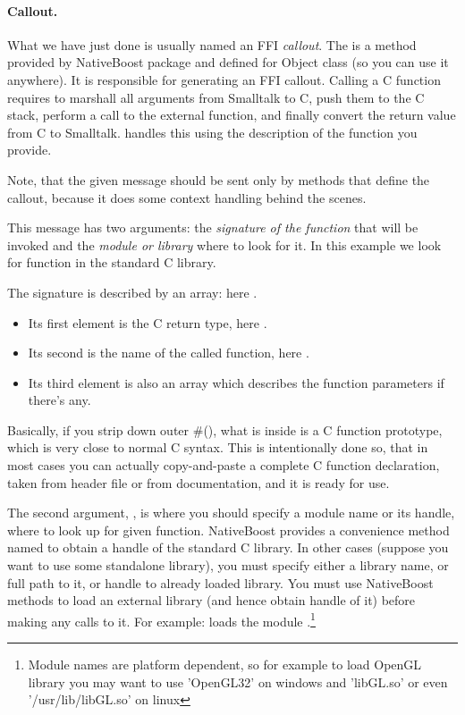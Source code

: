 \documentclass[a4paper,10pt,twoside]{book}
\begin{document}
\paragraph{Callout.}
What we have just done is usually named an FFI \emph{callout}. The
 is a method provided by NativeBoost package and
defined for Object class (so you can use it anywhere). It is
responsible for generating an FFI callout. Calling a C function
requires to marshall all arguments from Smalltalk to C, push them to
the C stack, perform a call to the external function, and finally
convert the return value from C to Smalltalk. 
handles this using the description of the function you provide.

Note, that the given message  should be sent only by methods that define the callout, because it does some context handling behind the scenes.

This message has two arguments: the \emph{signature of the function} that will be invoked and the \emph{module or library} where to look for it.  In this example we look for  function in the standard C library. 

The signature is described by an array: here .
\begin{itemize} 
\item Its first element is the C return type, here .
\item Its second is the name of the called function, here .
\item Its third element is also an array which describes the function parameters if there's any. 
\end{itemize}

Basically, if you strip down outer \#(), what is inside is a C function prototype, which is very close to normal C syntax. This is intentionally done so,
that in most cases you can actually copy-and-paste a complete C function declaration, taken from header file or from documentation, and it is ready for use.

The second argument, , is where you should specify a
module name or its handle, where to look up for given function.
NativeBoost provides a convenience method named  to
obtain a handle of the standard C library. In other cases (suppose you
want to use some standalone library), you must specify either a
library name, or full path to it, or handle to already loaded library.
You must use NativeBoost methods to load an external library (and
hence obtain handle of it) before making any calls to it. For example:
 loads
the module .\footnote{Module names are platform
  dependent, so for example to load OpenGL library you may want to use
  'OpenGL32' on windows and 'libGL.so' or even '/usr/lib/libGL.so' on
  linux }
\end{document}
